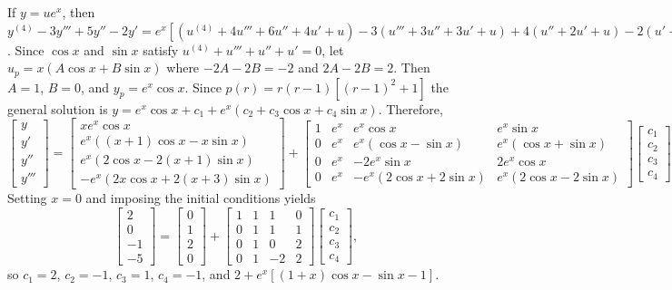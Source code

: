 \documentclass[dvips]{book}
\renewcommand{\exer}[1]{\par\medskip\;\noindent{\color{red}\bf #1.}}
\numberwithin{example}{section}
\numberwithin{equation}{section}
\numberwithin{theorem}{section}
\numberwithin{table}{section}
\numberwithin{figure}{section}
\begin{document}
\exer{9.3.74}
 If $y=ue^x$, then $y^{(4)}-3y'''+5y''-2y'=e^x[
(u^{(4)}+4u'''+6u''+4u'+u) -3(u'''+3u''+3u'+u) +4(u''+2u'+u) -2(u'+u)
]=e^x(u^{(4)}+u'''+u''+u')$. Since $\cos x$ and $\sin x$
satisfy $u^{(4)}+u'''+u''+u'=0$, let $u_p=x(A\cos x+B\sin x)$
where $-2A-2B=-2$ and $2A-2B=2$. Then $A=1$, $B=0$, and $y_p=e^x\cos
x$. Since $p(r)=r(r-1)[(r-1)^2+1]$ the general solution is
$y=e^x\cos x+c_1+e^x(c_2+c_3\cos x+c_4\sin x)$.
 Therefore,
$$
\left[\begin{array}{l}y\\y'\\y''\\y'''\end{array}\right]=
\left[\begin{array}{c}
xe^x\cos x\\
e^x((x+1)\cos x-x\sin x)\\
e^x(2\cos x-2(x+1)\sin x)\\
-e^x(2x\cos x+2(x+3)\sin x)
\end{array}\right]+
\left[\begin{array}{cccc}1&e^x&e^x\cos x&e^x\sin x\\
0&e^x&e^x(\cos x-\sin x)&e^x(\cos x+\sin x)
\\0&e^x&-2e^x\sin x&2e^x\cos x\\0&e^x&-e^x(2\cos x+2\sin x)
&e^x(2\cos x-2\sin x)\end{array}\right]
\left[\begin{array}{c}
c_1\\c_2\\c_3\\c_4
\end{array}\right]
$$
Setting $x=0$ and imposing the initial conditions yields
$$
\left[\begin{array}{r}
2\\0\\-1\\-5
\end{array}\right]=
\left[\begin{array}{r}
0\\1\\2\\0
\end{array}\right]+
\left[\begin{array}{cccc}1&1&1&0\\0&1&1&1\\
0&1&0&2\\0&1&-2&2\end{array}\right]
\left[\begin{array}{c}
c_1\\c_2\\c_3\\c_4
\end{array}\right],
$$
so $c_1=2$, $c_2=-1$, $c_3=1$, $c_4=-1$, and
$2 +e^x\left[(1+x)\cos x-\sin x-1\right]$.
\end{document}
